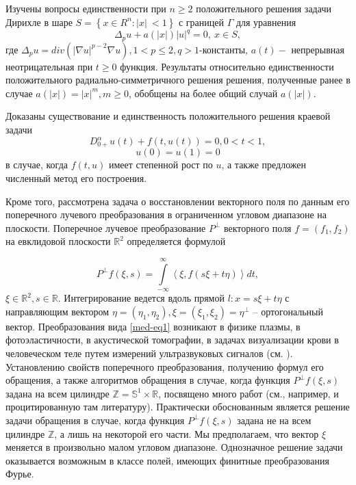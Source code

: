 Изучены вопросы единственности при $ n \geq 2$ положительного решения задачи Дирихле
в шаре
$ S=\left\{x\in R^n:\vert x \vert\ < 1 \right\} $
с границей $\Gamma $
для уравнения
$$
\Delta_{p} u+a(|x|){\vert u \vert}^q=0,\ x \in S,
$$
где $ \Delta_{p} u=div(\vert \nabla u\vert^{p-2}\nabla u),
1<p \le2, q>1 $-константы, $a(t)-$ непрерывная неотрицательная
при $t\geq 0 $ функция.
Результаты
относительно единственности положительного радиально-симметричного
решения решения, полученные ранее в случае
$a(|x|)=|x|^m, m\geq 0 $, обобщены на более общий случай $ a(|x|).$

Доказаны существование и
единственность положительного решения краевой задачи
$$
D_{0+}^{\alpha} u(t)+f(t,u(t) )=0,0<t<1,
$$
$$
u(0)=u(1)=0
$$
в случае, когда $f(t,u)$ имеет степенной рост по $u$, а также предложен
численный метод его построения.

















Кроме того, рассмотрена задача о восстановлении векторного поля по данным его поперечного лучевого преобразования в ограниченном угловом диапазоне на плоскости. Поперечное лучевое преобразование $P^\bot$ векторного поля $f=(f_1,f_2)$ на евклидовой плоскости $\mathbb R^2$ определяется формулой

\begin{equation}\label{med-eq1}
P^\bot f(\xi,s)=\int\limits_{-\infty}^\infty\left<\xi,f(s\xi+t\eta)\right>dt,
\end{equation}
$\xi\in\mathbb R^2, s\in\mathbb R$. Интегрирование ведется вдоль прямой $l: x=s\xi+t\eta$ с направляющим вектором $\eta=(\eta_1, \eta_2),  \xi=(\xi_1,\xi_2)=\eta^\bot$ -- ортогональный вектор. Преобразования вида \eqref{med-eq1} возникают в физике плазмы, в фотоэластичности, в акустической томографии, в задачах визуализации крови в человеческом теле путем измерений ультразвуковых сигналов (см. \cite{med-metka1,med-metka2}).
Установлению свойств поперечного преобразования, получению формул его обращения, а также алгоритмов обращения  в случае, когда функция  $P^\bot f(\xi,s)$ задана на всем цилиндре $\mathbb Z=\mathbb S^1\times\mathbb R$, посвящено много работ (см., например, \cite{med-metka2} и процитированную там литературу). Практически обоснованным является решение задачи обращения в случае, когда функция  $P^\bot f(\xi,s)$ задана не на всем цилиндре $\mathbb Z$, а лишь на некоторой его части. Мы предполагаем, что вектор $\xi$ меняется в произвольно малом угловом диапазоне. Однозначное решение задачи оказывается возможным в классе полей, имеющих финитные преобразования Фурье.

